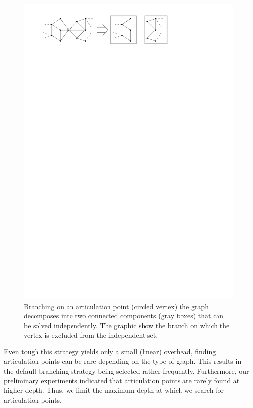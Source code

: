 \documentclass[a4paper,UKenglish,cleveref, autoref, thm-restate]{lipics-v2021}
\begin{document}
\begin{figure}[t]
  \centering
  \includegraphics[scale=1]{figures/articulation_points}
  \caption{Branching on an articulation point (circled vertex) the
    graph decomposes into two connected components (gray boxes) that can be
    solved independently. The graphic show the branch on which the vertex is
    excluded from the independent set.}
  \label{fig:articulation_points}
\end{figure}

Even tough this strategy yields only a small (linear) overhead, finding articulation points can be rare depending on the type of graph.
This results in the default branching strategy being selected rather
frequently.
Furthermore, our preliminary experiments indicated that articulation points are rarely found at higher depth.
Thus, we limit the maximum depth at which we search for articulation points.
\end{document}
